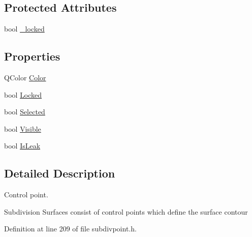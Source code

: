 \subsection*{Protected Attributes}
\begin{DoxyCompactItemize}
\item 
bool \hyperlink{classShipCAD_1_1SubdivisionControlPoint_acf4dc0c2a3d4c52847c68a8a412669f5}{\-\_\-locked}
\end{DoxyCompactItemize}
\subsection*{Properties}
\begin{DoxyCompactItemize}
\item 
Q\-Color \hyperlink{classShipCAD_1_1SubdivisionControlPoint_a8c7a97ce5194163f37a4b655f87bc309}{Color}
\item 
bool \hyperlink{classShipCAD_1_1SubdivisionControlPoint_af7c63177a12f4c60bb4a2a6615482a98}{Locked}
\item 
bool \hyperlink{classShipCAD_1_1SubdivisionControlPoint_a54bf97e33f121843af563f2eebe7d3e5}{Selected}
\item 
bool \hyperlink{classShipCAD_1_1SubdivisionControlPoint_ab796dbf230e01f51a1031ec69f8f7f66}{Visible}
\item 
bool \hyperlink{classShipCAD_1_1SubdivisionControlPoint_a33a15d8a83f43369313d57a854046ff7}{Is\-Leak}
\end{DoxyCompactItemize}


\subsection{Detailed Description}
Control point. 

Subdivision Surfaces consist of control points which define the surface contour 

Definition at line 209 of file subdivpoint.\-h.



